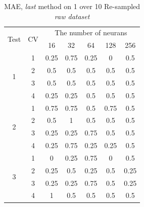 \documentclass[draft,dvipsnames]{drexel-thesis}
\begin{document}
\begin{thesis}
\begin{table}[!t]
\centering
\caption{MAE, {\em last} method on 1 over 10 Re-sampled {\em raw dataset}}
\label{tbl:mae_last_1_10}
\begin{tabular}{|c|c|c|c|c|c|c|}
\hline
\multirow{2}{*}{Test} & \multirow{2}{*}{CV} & \multicolumn{5}{c|}{The number of neurans}                               \\ \cline{3-7} 
                      &                     & 16           & 32           & 64           & 128          & 256          \\ \hline
\multirow{4}{*}{1}    & 1                   & 0.25         & 0.75         & 0.25         & 0            & 0.5          \\ \cline{2-7} 
                      & 2                   & 0.5          & 0.5          & 0.5          & 0.5          & 0.5          \\ \cline{2-7} 
                      & 3                   & 0.5          & 0.5          & 0.5          & 0.5          & 0.5          \\ \cline{2-7} 
                      & 4                   & 0.25         & 0.25         & 0.5          & 0.5          & 0.5          \\ \hline
\multirow{4}{*}{2}    & 1                   & 0.75         & 0.75         & 0.5          & 0.75         & 0.5          \\ \cline{2-7} 
                      & 2                   & 0.5          & 1            & 0.5          & 0.5          & 0.5          \\ \cline{2-7} 
                      & 3                   & 0.25         & 0.25         & 0.75         & 0.5          & 0.5          \\ \cline{2-7} 
                      & 4                   & 0.25         & 0.75         & 0.25         & 0.25         & 0.5          \\ \hline
\multirow{4}{*}{3}    & 1                   & 0            & 0.25         & 0.75         & 0            & 0.5          \\ \cline{2-7} 
                      & 2                   & 0.25         & 0.5          & 0.25         & 0.5          & 0.25         \\ \cline{2-7} 
                      & 3                   & 0.25         & 0.25         & 0.75         & 0.5          & 0.25         \\ \cline{2-7} 
                      & 4                   & 1            & 0.5          & 0.5          & 0.5          & 0.5          \\ \hline

\end{tabular}
\end{table}
\end{thesis}
\end{document}
